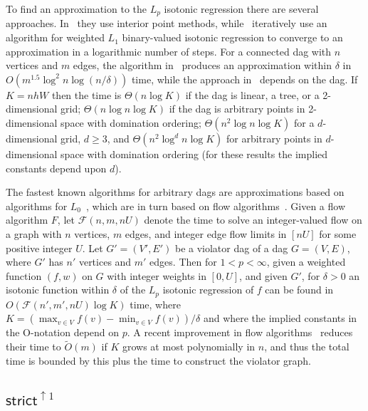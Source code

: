 \documentclass[11pt]{article}
\begin{document}
To find an approximation to the $L_p$ isotonic regression there are several approaches.
In~\cite{Yale_AllLp} they use interior point methods, while~\cite{QPartition,QLpviaL0} iteratively use an algorithm for weighted $L_1$ binary-valued isotonic regression to converge to an approximation in a logarithmic number of steps.
For a connected dag with $n$ vertices and $m$ edges, the algorithm in~\cite{Yale_AllLp} produces an approximation within $\delta$ in $O(m^{1.5} \log^2 n \log (n/\delta))$ time, while the approach in~\cite{QPartition} depends on the dag.
If $K = nhW$ then the time is $\Theta(n \log K)$ if the dag is linear, a tree, or a 2-dimensional grid; $\Theta(n \log n \log K)$ if the dag is arbitrary points in 2-dimensional space with domination ordering; $\Theta(n^2 \log n \log K)$ for a $d$-dimensional grid, $d \geq 3$, and $\Theta(n^2 \log^d n \log K)$ for arbitrary points in $d$-dimensional space with domination ordering (for these results the implied constants depend upon $d$).

The fastest known algorithms for arbitrary dags are approximations based on algorithms for $L_0$~\cite{QLpviaL0}, which are in turn based on flow algorithms~\cite{RadeBM_MaxIS}.
Given a flow algorithm $F$, let $\mathcal{F}(n,m,nU)$ denote the time to solve an integer-valued flow on a graph with $n$ vertices, $m$ edges, and integer edge flow limits in $[nU]$ for some positive integer $U$.
Let $G' = (V',E')$ be a violator dag of a dag $G = (V,E)$, where $G'$ has $n'$ vertices and $m'$ edges.
Then for $1 < p < \infty$, given a weighted function $(f,w)$ on $G$ with integer weights in $[0,U]$, and given $G'$, for $\delta > 0$ an isotonic function within $\delta$ of the $L_p$ isotonic regression of $f$ can be found in $O(\mathcal{F}(n',m', nU) \log K)$ time, where $K = \left(\max_{v \in V} f(v)  - \min_{v \in V} f(v)\right)/\delta$ and where the implied constants in the O-notation depend on $p$.
A recent improvement in flow algorithms~\cite{Flow_That} reduces their time to  $\tilde{O}(m)$ if $K$ grows at most polynomially in $n$, and thus the total time is bounded by this plus the time to construct the violator graph.



\subsection{$\mathsf{strict}^{\uparrow 1}$}   \label{sec:strictup1}
\end{document}
